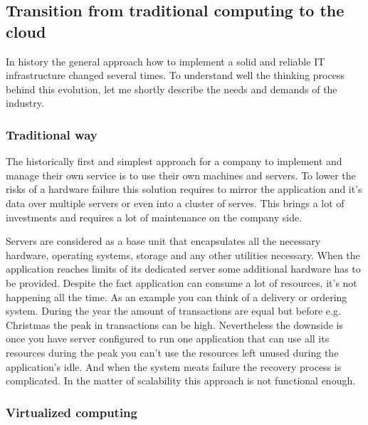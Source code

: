 \subsection{Transition from traditional computing to the cloud}
\label{sub:Transition from traditional computing to the cloud}

In history the general approach how to implement a solid and reliable IT infrastructure changed several times. To understand well the thinking process behind this evolution, let me shortly describe the needs and demands of the industry.

\subsubsection{Traditional way}
\label{subs:Traditional way}

The historically first and simplest approach for a company to implement and manage their own service is to use their own machines and servers. To lower the risks of a hardware failure this solution requires to mirror the application and it's data over multiple servers or even into a cluster of serves. This brings a lot of investments and requires a lot of maintenance on the company side.

Servers are considered as a base unit that encapsulates all the necessary hardware, operating systems, storage and any other utilities necessary. When the application reaches limits of its dedicated server some additional hardware has to be provided. Despite the fact application can consume a lot of resources, it's not happening all the time. As an example you can think of a delivery or ordering system. During the year the amount of transactions are equal but before e.g. Christmas the peak in transactions can be high. Nevertheless the downside is once you have server configured to run one application that can use all its resources during the peak you can't use the resources left unused during the application's idle. And when the system meats failure the recovery process is complicated. In the matter of scalability this approach is not functional enough.

\subsubsection{Virtualized computing}
\label{subs:Virtualized computing}

